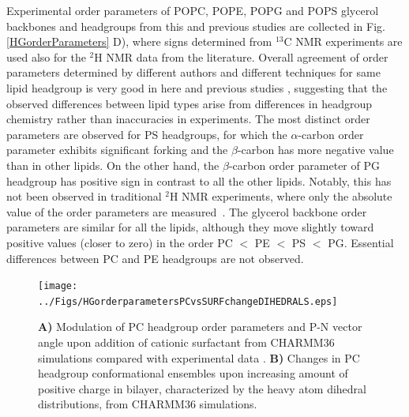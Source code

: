 \documentclass[aps,prl,superscriptaddress,twocolumn]{revtex4}
\begin{document}
Experimental order parameters of POPC, POPE, POPG and POPS glycerol backbones and
headgroups from this and previous studies are collected in Fig. \ref{HGorderParameters} D),
where signs determined from $^{13}$C NMR experiments are used also for the $^2$H NMR data from the literature.
Overall agreement of order parameters determined by different authors and different techniques
for same lipid headgroup is very good in here and previous studies \cite{botan15,ollila16,antila19},
suggesting that the observed differences between lipid types arise from differences in
headgroup chemistry rather than inaccuracies in experiments. 
The most distinct order parameters are observed for PS headgroups,
for which the $\alpha$-carbon order parameter exhibits significant forking
and the $\beta$-carbon has more negative value than in other lipids.
On the other hand, the $\beta$-carbon order parameter of PG headgroup
has positive sign in contrast to all the other lipids.
Notably, this has not been observed in traditional $^2$H NMR experiments,
where only the absolute value of the order parameters are measured~\cite{wohlgemuth80,gally81,borle85}.
The glycerol backbone order parameters are similar for all the lipids, although they move slightly toward
positive values (closer to zero) in the order PC $<$ PE $<$ PS $<$ PG.
Essential differences between PC and PE headgroups are not observed.


\begin{figure}[bt]
  \centering
  \texttt{[image: ../Figs/HGorderparametersPCvsSURFchangeDIHEDRALS.eps]}
  \caption{\label{changesWITHsurf}
    {\bf A)} Modulation of PC headgroup order parameters and P-N vector angle upon addition of cationic surfactant
    from CHARMM36 simulations compared with experimental data \cite{??}.
    {\bf B)} Changes in PC headgroup conformational ensembles upon increasing amount of positive charge in bilayer,
    characterized by the heavy atom dihedral distributions, from CHARMM36 simulations.
  }
\end{figure}
\end{document}
